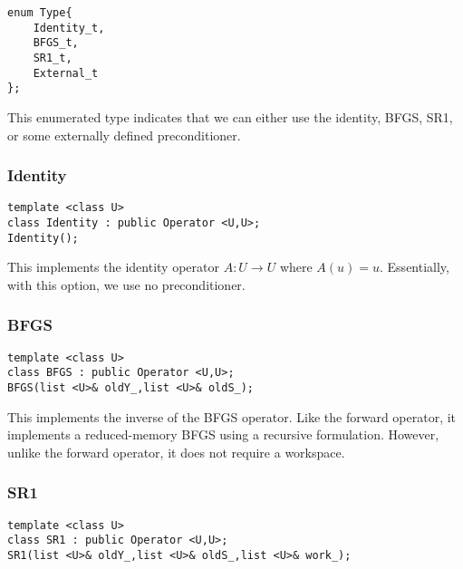 \documentclass{article}
\begin{document}
\begin{flushleft}
\begin{lstlisting}
enum Type{      
    Identity_t,  
    BFGS_t,       
    SR1_t,
    External_t
};
\end{lstlisting}
\end{flushleft}

This enumerated type indicates that we can either use the identity, BFGS, SR1, or some externally defined preconditioner.

\subsubsection{Identity}

\begin{flushleft}
\begin{lstlisting}
template <class U>
class Identity : public Operator <U,U>; 
Identity();
\end{lstlisting}
\end{flushleft}

This implements the identity operator $A:U\rightarrow U$ where $A(u)=u$.  Essentially, with this option, we use no preconditioner.


\subsubsection{BFGS}

\begin{flushleft}
\begin{lstlisting}
template <class U>
class BFGS : public Operator <U,U>;
BFGS(list <U>& oldY_,list <U>& oldS_); 
\end{lstlisting}
\end{flushleft}

This implements the inverse of the BFGS operator.  Like the forward operator, it implements a reduced-memory BFGS using a recursive formulation.  However, unlike the forward operator, it does not require a workspace.

\subsubsection{SR1}

\begin{flushleft}
\begin{lstlisting}
template <class U>
class SR1 : public Operator <U,U>;
SR1(list <U>& oldY_,list <U>& oldS_,list <U>& work_); 
\end{lstlisting}
\end{flushleft}
\end{document}
